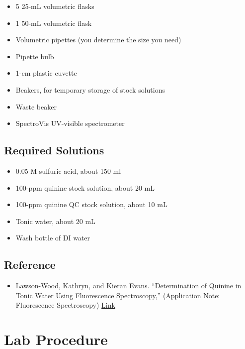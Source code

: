 \documentclass[]{tufte-book}
\providecommand{\tightlist}{%
  \setlength{\itemsep}{0pt}\setlength{\parskip}{0pt}}
\begin{document}
\begin{itemize}
\tightlist
\item
  5 25-mL volumetric flasks
\item
  1 50-mL volumetric flask
\item
  Volumetric pipettes (you determine the size you need)
\item
  Pipette bulb
\item
  1-cm plastic cuvette
\item
  Beakers, for temporary storage of stock solutions
\item
  Waste beaker
\item
  SpectroVis UV-visible spectrometer
\end{itemize}

\hypertarget{required-solutions}{%
\subsection*{Required Solutions}\label{required-solutions}}

\begin{itemize}
\tightlist
\item
  0.05 M sulfuric acid, about 150 ml
\item
  100-ppm quinine stock solution, about 20 mL
\item
  100-ppm quinine QC stock solution, about 10 mL
\item
  Tonic water, about 20 mL
\item
  Wash bottle of DI water
\end{itemize}

\hypertarget{reference}{%
\subsection*{Reference}\label{reference}}

\begin{itemize}
\tightlist
\item
  Lawson-Wood, Kathryn, and Kieran Evans. ``Determination of Quinine
  in Tonic Water Using Fluorescence Spectroscopy,'' (Application Note: Fluorescence Spectroscopy) \href{https://www.perkinelmer.com/lab-solutions/resources/docs/APP_Quinine_in_Tonic_Water_014133_01.pdf}{Link}
\end{itemize}

\newpage

\hypertarget{uv-vis-procedure}{%
\section{Lab Procedure}\label{uv-vis-procedure}}
\end{document}
